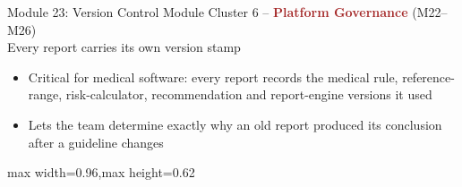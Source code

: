 \documentclass[9pt,aspectratio=169]{beamer}
\begin{document}
\begin{frame}[t]{Module 23: Version Control Module}
\textcolor{black!55}{\scriptsize Cluster 6 -- \textcolor{brown}{\textbf{Platform Governance}} (M22--M26) \\ Every report carries its own version stamp}\\[2pt]
\begin{itemize}
\scriptsize
\item Critical for medical software: every report records the medical rule, reference-range, risk-calculator, recommendation and report-engine versions it used
\item Lets the team determine exactly why an old report produced its conclusion after a guideline changes
\end{itemize}
\vspace{4pt}
\begin{center}
\begin{adjustbox}{max width=0.96\linewidth,max height=0.62\textheight}
\end{adjustbox}
\end{center}
\end{frame}
\end{document}
